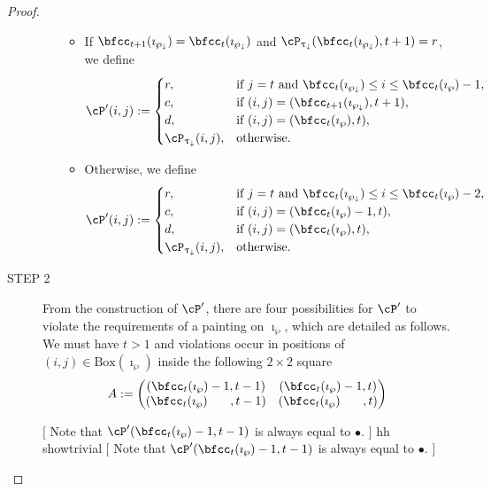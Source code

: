 \documentclass[12pt,a4paper]{amsart}
\newcommand{\trivial}[2][]{\if\relax\detokenize{#1}\relax
  {%
      \color{orange} \vspace{0em} $[$  #2 $]$
      \color{black}
  }
  \else
\ifx#1h
\ifcsname showtrivial\endcsname
{%
    \color{orange} \vspace{0em}  $[$ #2 $]$
    \color{black}
}
\fi
\else {\red Wrong argument!} \fi
\fi
}
\numberwithin{equation}{section}
\theoremstyle{remark}
\def\BOX#1{\mathrm{Box}(#1)}
\begin{document}
\begin{proof}
\begin{description}
\begin{enumerate}[label=(\alph*)]
\begin{itemize}
              \item If $\bfcc_{t+1}(\imath_{\PPm}) = \bfcc_{t}(\imath_{\PPm})$
              and
              $\cP_{\uptaum}(\bfcc_{t}(\imath_{\PPm}),t+1) = r$,
              we define
              \[
                \cP'(i,j) := \begin{cases}
                  r ,& \text{if $j=t$ and $\bfcc_{t}(\imath_{\PPm})\leq i \leq \bfcc_{t}(\imath_{\wp})-1$},\\
                  c ,& \text{if $(i,j)=(\bfcc_{t+1}(\imath_{\PPm}),t+1)$},\\
                  d ,& \text{if $(i,j)=(\bfcc_{t}(\imath_{\wp}),t)$},\\
                  \cP_{\uptaum}(i,j) ,&\text{otherwise}.
                \end{cases}
              \]
              \item Otherwise, we define
              \[
                \cP'(i,j) := \begin{cases}
                  r ,& \text{if $j=t$ and $\bfcc_{t}(\imath_{\PPm})\leq i \leq \bfcc_{t}(\imath_{\wp})-2$},\\
                  c ,& \text{if $(i,j)=(\bfcc_{t}(\imath_{\wp})-1,t)$},\\
                  d ,& \text{if $(i,j)=(\bfcc_{t}(\imath_{\wp}),t)$},\\
                  \cP_{\uptaum}(i,j) ,&\text{otherwise}.
                \end{cases}
              \]
            \end{itemize}
          \end{enumerate}

    \item[STEP 2] From the construction of $\cP'$, there are four possibilities for $\cP'$ to violate the requirements of a painting on $\imath_{\wp}$, which are detailed as follows. We must have $t>1$ and violations occur in positions of $(i,j)\in \BOX{\imath_{\wp}}$ inside the following $2\times 2$ square
         \[
          A :=
          \begin{pmatrix}
            (\bfcc_{t}(\imath_{\wp})-1,t-1) & (\bfcc_{t}(\imath_{\wp})-1,t) \\
            (\bfcc_{t}(\imath_{\wp})\;\phantom{-1}\;,t-1) & (\bfcc_{t}(\imath_{\wp})\;\phantom{-1}\;,t) \\
          \end{pmatrix}
          \]

          \trivial[h]{
          Note that  $\cP'(\bfcc_{t}(\imath_{\wp})-1,t-1)$ is always equal to
          $\bullet$.
          }


\end{description}
\end{proof}
\end{document}
